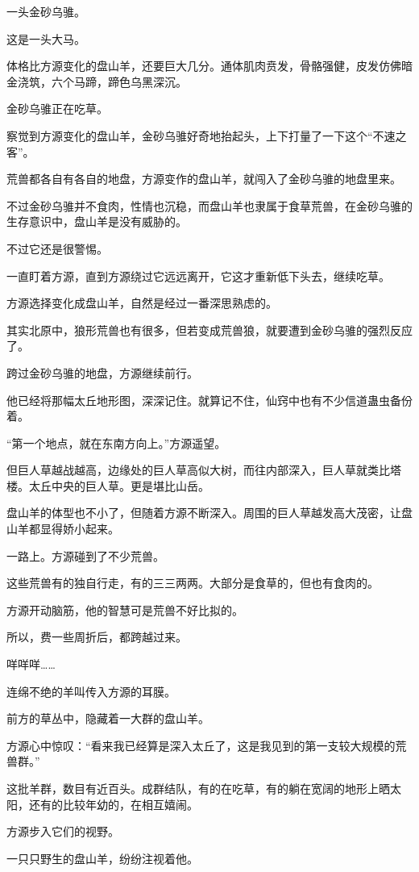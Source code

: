 \begin{this_body}
一头金砂乌骓。

这是一头大马。

体格比方源变化的盘山羊，还要巨大几分。通体肌肉贲发，骨骼强健，皮发仿佛暗金浇筑，六个马蹄，蹄色乌黑深沉。

金砂乌骓正在吃草。

察觉到方源变化的盘山羊，金砂乌骓好奇地抬起头，上下打量了一下这个“不速之客”。

荒兽都各自有各自的地盘，方源变作的盘山羊，就闯入了金砂乌骓的地盘里来。

不过金砂乌骓并不食肉，性情也沉稳，而盘山羊也隶属于食草荒兽，在金砂乌骓的生存意识中，盘山羊是没有威胁的。

不过它还是很警惕。

一直盯着方源，直到方源绕过它远远离开，它这才重新低下头去，继续吃草。

方源选择变化成盘山羊，自然是经过一番深思熟虑的。

其实北原中，狼形荒兽也有很多，但若变成荒兽狼，就要遭到金砂乌骓的强烈反应了。

跨过金砂乌骓的地盘，方源继续前行。

他已经将那幅太丘地形图，深深记住。就算记不住，仙窍中也有不少信道蛊虫备份着。

“第一个地点，就在东南方向上。”方源遥望。

但巨人草越战越高，边缘处的巨人草高似大树，而往内部深入，巨人草就类比塔楼。太丘中央的巨人草。更是堪比山岳。

盘山羊的体型也不小了，但随着方源不断深入。周围的巨人草越发高大茂密，让盘山羊都显得娇小起来。

一路上。方源碰到了不少荒兽。

这些荒兽有的独自行走，有的三三两两。大部分是食草的，但也有食肉的。

方源开动脑筋，他的智慧可是荒兽不好比拟的。

所以，费一些周折后，都跨越过来。

咩咩咩……

连绵不绝的羊叫传入方源的耳膜。

前方的草丛中，隐藏着一大群的盘山羊。

方源心中惊叹：“看来我已经算是深入太丘了，这是我见到的第一支较大规模的荒兽群。”

这批羊群，数目有近百头。成群结队，有的在吃草，有的躺在宽阔的地形上晒太阳，还有的比较年幼的，在相互嬉闹。

方源步入它们的视野。

一只只野生的盘山羊，纷纷注视着他。


\end{this_body}
